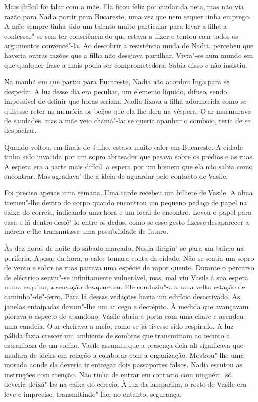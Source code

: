 Mais difícil foi falar com a mãe. Ela ficou feliz por cuidar da neta,
mas não via razão para Nadia partir para
Bucareste, uma vez que nem sequer tinha emprego. A mãe sempre tinha tido
um talento muito particular para levar a filha a confessar"-se sem ter
consciência do que estava a dizer e tentou com todos os argumentos
convencê"-la. Ao descobrir a resistência muda de Nadia, percebeu que
haveria outras razões que a filha não desejava partilhar. Vivia"-se num mundo em que qualquer frase a mais podia ser comprometedora.
Sabia disso e não insistiu.

Na manhã em que partiu para Bucareste, Nadia não acordou Inga para se
despedir. A luz desse dia era peculiar, um elemento líquido, difuso,
sendo impossível de definir que horas seriam. Nadia fixava a filha
adormecida como se quisesse reter na memória os beijos que ela lhe dera
na véspera. O ar murmurava de saudades, mas a mãe veio chamá"-la: se
queria apanhar o comboio, teria de se despachar.

\bigskip

Quando voltou, em finais de Julho, estava muito calor em Bucareste. A
cidade tinha sido invadida por um sopro abrasador que pesava sobre os
prédios e as ruas. A espera era a parte mais difícil, a espera por um
homem que ela não sabia como encontrar. Mas agradava"-lhe a ideia de
aguardar pelo contacto de Vasile.

Foi preciso apenas uma semana. Uma tarde recebeu um bilhete de Vasile. A
alma tremeu"-lhe dentro do corpo quando encontrou um pequeno pedaço de
papel na caixa do correio, indicando uma hora e um local de encontro.
Levou o papel para casa e lá dentro desfê"-lo entre os dedos, como se
esse gesto fizesse desaparecer a inércia e lhe transmitisse uma
possibilidade de futuro.

Às dez horas da noite do sábado marcado, Nadia dirigiu"-se para um
bairro na periferia. Apesar da hora, o calor tomara conta da cidade. Não
se sentia um sopro de vento e sobre as ruas pairava uma espécie de vapor
quente. Durante o percurso de eléctrico sentiu"-se infinitamente
vulnerável, mas, mal viu Vasile à sua espera numa esquina, a sensação
desapareceu. Ele conduziu"-a a uma velha estação de caminho"-de"-ferro.
Para lá dessas vedações havia um edifício desactivado. As janelas
entaipadas davam"-lhe um ar cego e decrépito. À medida que avançavam
piorava o aspecto de abandono. Vasile abriu a porta com uma chave e
acendeu uma candeia. O ar cheirava a mofo, como se já tivesse sido
respirado. A luz pálida fazia crescer um ambiente de sombras que
transmitiam ao recinto a estranheza de um sonho. Vasile assumiu que a
presença dela ali significava que mudara de ideias em relação a
colaborar com a organização. Mostrou"-lhe uma morada aonde ela deveria ir
entregar dois passaportes falsos. Nadia escutou as instruções com
atenção. Não tinha de entrar em contacto com ninguém, só deveria
deixá"-los na caixa do correio. À luz da lamparina, o rosto de Vasile era
leve e impreciso, transmitindo"-lhe, no entanto, segurança.

